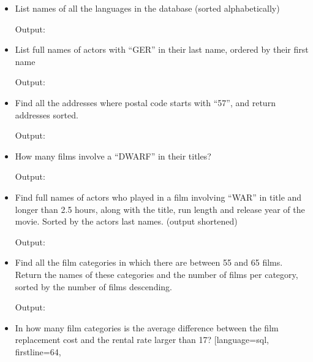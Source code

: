 \documentclass{assignment}
\begin{document}
\begin{itemize}[noitemsep]
    \item List names of all the languages in the database (sorted
        alphabetically)
        
        Output:
        
    \item List full names of actors with ``GER'' in their last name,
        ordered by their first name
        
        \newpage
        Output:
        
    \item Find all the addresses where postal code starts with
        ``57'', and return addresses sorted.
        
        Output:
        
    \item How many films involve a ``DWARF'' in their titles?
        
        Output:
        
    \item Find full names of actors who played in a film involving
        ``WAR'' in title and longer than 2.5 hours, along with the
        title, run length and release year of the movie. Sorted by
        the actors last names. (output shortened)
        
        Output:
        
    \item Find all the film categories in which there are between 55
        and 65 films. Return the names of these categories and the
        number of films per category, sorted by the number of films descending.
        
        Output:
        
    \item In how many film categories is the average difference between
        the film replacement cost and the rental rate larger than 17?
        [language=sql, firstline=64,

\end{itemize}
\end{document}
